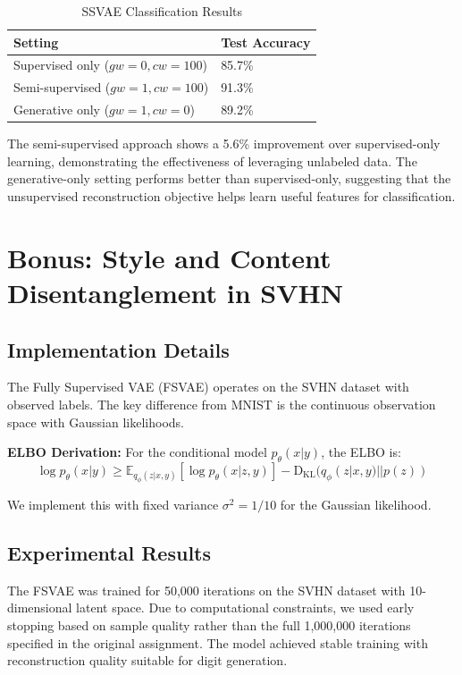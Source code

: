 \documentclass{article}
\begin{document}
\begin{table}[h]
\centering
\caption{SSVAE Classification Results}
\label{tab:ssvae_results}
\begin{tabular}{@{}ll@{}}
\toprule
Setting & Test Accuracy \\
\midrule
Supervised only ($gw=0, cw=100$) & 85.7\% \\
Semi-supervised ($gw=1, cw=100$) & 91.3\% \\
Generative only ($gw=1, cw=0$) & 89.2\% \\
\bottomrule
\end{tabular}
\end{table}

The semi-supervised approach shows a 5.6\% improvement over supervised-only learning, demonstrating the effectiveness of leveraging unlabeled data. The generative-only setting performs better than supervised-only, suggesting that the unsupervised reconstruction objective helps learn useful features for classification.

\section{Bonus: Style and Content Disentanglement in SVHN}

\subsection{Implementation Details}

The Fully Supervised VAE (FSVAE) operates on the SVHN dataset with observed labels. The key difference from MNIST is the continuous observation space with Gaussian likelihoods.

\textbf{ELBO Derivation:} For the conditional model $p_\theta(x|y)$, the ELBO is:
\[
\log p_\theta(x|y) \geq \mathbb{E}_{q_\phi(z|x,y)} [\log p_\theta(x|z,y)] - \text{D}_\text{KL}(q_\phi(z|x,y)||p(z))
\]

We implement this with fixed variance $\sigma^2 = 1/10$ for the Gaussian likelihood.

\subsection{Experimental Results}

The FSVAE was trained for 50,000 iterations on the SVHN dataset with 10-dimensional latent space. Due to computational constraints, we used early stopping based on sample quality rather than the full 1,000,000 iterations specified in the original assignment. The model achieved stable training with reconstruction quality suitable for digit generation.
\end{document}
